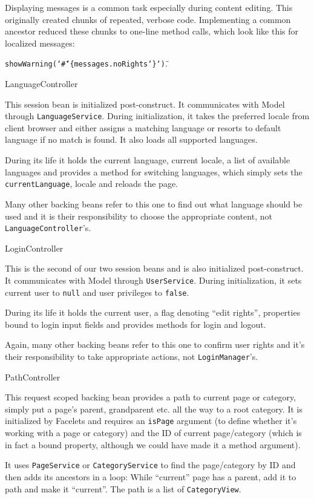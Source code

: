 Displaying messages is a common task especially during content editing. This originally created chunks of repeated, verbose code. Implementing a common ancestor reduced these chunks to one-line method calls, which look like this for localized messages:

 {\tt showWarning(\char`\"\#\char`\{messages.noRights\char`\}\char`\")}.

\secc LanguageController

This session bean is initialized post-construct. It communicates with Model through {\tt LanguageService}. During initialization, it takes the preferred locale from client browser and either assigns a matching language or resorts to default language if no match is found. It also loads all supported languages.

During its life it holds the current language, current locale, a list of available languages and provides a method for switching languages, which simply sets the {\tt currentLanguage}, locale and reloads the page.

Many other backing beans refer to this one to find out what language should be used and it is their responsibility to choose the appropriate content, not {\tt LanguageController}’s.

\secc LoginController

This is the second of our two session beans and is also initialized post-construct. It communicates with Model through {\tt UserService}. During initialization, it sets current user to {\tt null} and user privileges to {\tt false}.

During its life it holds the current user, a flag denoting “edit rights”, properties bound to login input fields and provides methods for login and logout.

Again, many other backing beans refer to this one to confirm user rights and it’s their responsibility to take appropriate actions, not {\tt LoginManager}’s.

\secc PathController

This request scoped backing bean provides a path to current page or category, simply put a page’s parent, grandparent etc. all the way to a root category. It is initialized by Facelets and requires an {\tt isPage} argument (to define whether it’s working with a page or category) and the ID of current page/category (which is in fact a bound property, although we could have made it a method argument).

It uses {\tt PageService} or {\tt CategoryService} to find the page/category by ID and then adds its ancestors in a loop: While “current” page has a parent, add it to path and make it “current”. The path is a list of {\tt CategoryView}.

